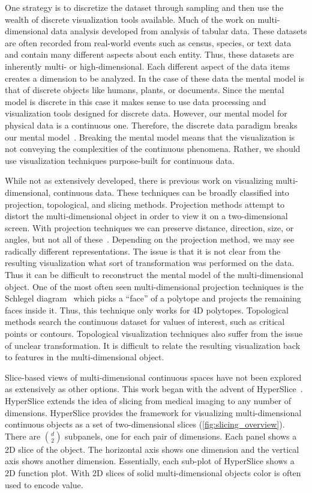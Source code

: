 One strategy is to discretize the dataset through sampling and then use the
wealth of discrete visualization tools available. Much of the work on
multi-dimensional data analysis developed from analysis of 
tabular data. These datasets are often recorded from real-world
events such as census, species, or text data and contain many different aspects
about each entity. Thus, these datasets are inherently multi- or high-dimensional.
Each different aspect of the data items creates a dimension to be analyzed. 
In the case of these data the mental model is that of discrete objects
like humans, plants, or documents. Since the mental model is discrete in this
case it makes sense to use data processing and visualization tools designed for
discrete data.  However, our mental model for physical data is a continuous 
one. Therefore, the
discrete data paradigm breaks our mental model~\cite{Tory:2004a,Liu:2010a}. 
Breaking the mental model means that the visualization is not conveying the
complexities of the continuous phenomena.
Rather, we
should use visualization techniques purpose-built for continuous data.

While not as
extensively developed, there is previous work on visualizing multi-dimensional,
continuous data. These techniques can be broadly classified into projection,
topological, and slicing methods.   Projection methods attempt to
distort the multi-dimensional object in order to view it on a two-dimensional
screen. With projection techniques we can preserve distance, direction, size,
or angles, but not all of 
these~\cite{Snyder:1987}. 
Depending on the
projection method, we may see radically different representations.  The issue
is that it is not clear from the resulting visualization what sort of
transformation was performed on the data.  Thus it can be difficult to
reconstruct the mental model of the multi-dimensional object.  One of the most
often seen multi-dimensional projection techniques is the Schlegel
diagram~\cite{Sommerville:1929} which picks a ``face'' of a polytope and projects the
remaining faces inside it. Thus, this technique only works for 4D polytopes.
Topological methods search the continuous dataset for values of interest, such
as critical points or contours.  Topological visualization techniques also
suffer from the issue of unclear transformation. It is difficult to relate the
resulting visualization back to features in the multi-dimensional object.

Slice-based views of multi-dimensional continuous spaces have not been explored
as extensively as other options.  This work began with the advent of
HyperSlice~\cite{Wijk:1993}.  HyperSlice extends the idea of slicing from
medical imaging to any number of dimensions.  HyperSlice provides the framework
for visualizing multi-dimensional continuous objects as a set of
two-dimensional slices (\autoref{fig:slicing_overview}).  There are $d \choose
2$ subpanels, one for each pair of dimensions. Each panel shows a 2D slice of
the object. The horizontal axis shows one dimension and the vertical axis shows
another dimension. Essentially, each sub-plot of HyperSlice shows a 2D function
plot. With 2D slices of solid multi-dimensional objects color is often used to
encode value. 

